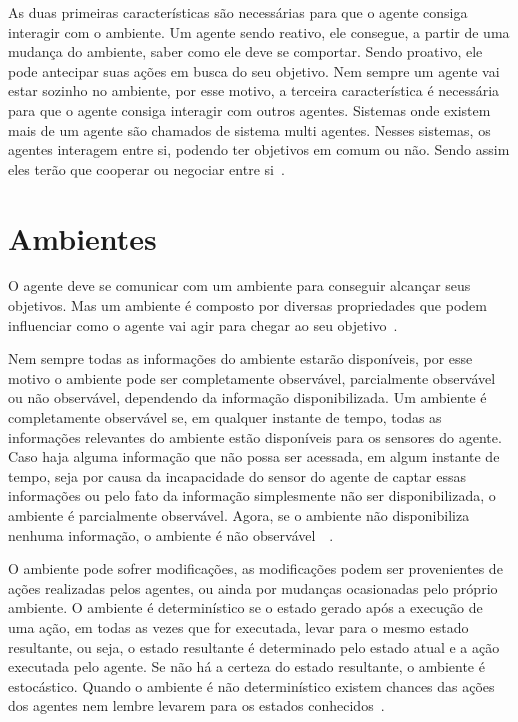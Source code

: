 As duas primeiras características são necessárias para que o agente consiga interagir com o ambiente.
Um agente sendo reativo, ele consegue, a partir de uma mudança do ambiente, saber como ele deve se comportar. Sendo proativo, ele pode antecipar suas ações em busca do seu objetivo.
Nem sempre um agente vai estar sozinho no ambiente, por esse motivo, a terceira característica é necessária para que o agente consiga interagir com outros agentes. Sistemas onde existem mais de um agente são chamados de sistema multi agentes. Nesses sistemas, os agentes interagem entre si, podendo ter objetivos em comum ou não. Sendo assim eles terão que cooperar ou negociar entre si~\cite[Capítulo 7]{intelligence2003modern}.

\section{Ambientes}

O agente deve se comunicar com um ambiente para conseguir alcançar seus objetivos. Mas um ambiente é composto por diversas propriedades que podem influenciar como o agente vai agir para chegar ao seu objetivo~\cite[Capítulo 2]{intelligence2003modern}. 

Nem sempre todas as informações do ambiente estarão disponíveis, por esse motivo o ambiente pode ser completamente observável, parcialmente observável ou não observável, dependendo da informação disponibilizada. Um ambiente é completamente observável se, em qualquer instante de tempo, todas as informações relevantes do ambiente estão disponíveis para os sensores do agente. Caso haja alguma informação que não possa ser acessada, em algum instante de tempo, seja por causa da incapacidade do sensor do agente de captar essas informações ou pelo fato da informação simplesmente não ser disponibilizada, o ambiente é parcialmente observável. Agora, se o ambiente não disponibiliza nenhuma informação, o ambiente é não observável~\cite[Capítulo 2]{intelligence2003modern}~\cite{agent1999}.   

O ambiente pode sofrer modificações, as modificações podem ser provenientes de ações realizadas pelos agentes, ou ainda por mudanças ocasionadas pelo próprio ambiente. O ambiente é determinístico se o estado gerado após a execução de uma ação, em todas as vezes que for executada, levar para o mesmo estado resultante, ou seja, o estado resultante é determinado pelo estado atual e a ação executada pelo agente. Se não há a certeza do estado resultante, o ambiente é estocástico. Quando o ambiente é não determinístico existem chances das ações dos agentes nem lembre levarem para os estados conhecidos~\cite[Capítulo 2]{intelligence2003modern}. 


